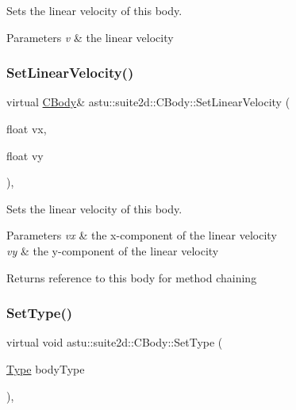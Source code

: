 Sets the linear velocity of this body.


\begin{DoxyParams}{Parameters}
{\em v} & the linear velocity \\
\hline
\end{DoxyParams}
\mbox{\label{classastu_1_1suite2d_1_1CBody_a782e16301f7268e7a511df7cdf39e168}} 
\subsubsection{\texorpdfstring{Set\+Linear\+Velocity()}{SetLinearVelocity()}\hspace{0.1cm}{\footnotesize\ttfamily [2/2]}}
{\footnotesize\ttfamily virtual \hyperlink{classastu_1_1suite2d_1_1CBody}{C\+Body}\& astu\+::suite2d\+::\+C\+Body\+::\+Set\+Linear\+Velocity (\begin{DoxyParamCaption}\item[{float}]{vx,  }\item[{float}]{vy }\end{DoxyParamCaption})\hspace{0.3cm}{\ttfamily [inline]}, {\ttfamily [virtual]}}

Sets the linear velocity of this body.


\begin{DoxyParams}{Parameters}
{\em vx} & the x-\/component of the linear velocity \\
\hline
{\em vy} & the y-\/component of the linear velocity \\
\hline
\end{DoxyParams}
\begin{DoxyReturn}{Returns}
reference to this body for method chaining 
\end{DoxyReturn}
\mbox{\label{classastu_1_1suite2d_1_1CBody_a7bc4b66e64442095a7b5ef4c689e6ccd}} 
\subsubsection{\texorpdfstring{Set\+Type()}{SetType()}}
{\footnotesize\ttfamily virtual void astu\+::suite2d\+::\+C\+Body\+::\+Set\+Type (\begin{DoxyParamCaption}\item[{\hyperlink{classastu_1_1suite2d_1_1CBody_a5731a8b9f24de5494683e4b7e8016b64}{Type}}]{body\+Type }\end{DoxyParamCaption})\hspace{0.3cm}{\ttfamily [inline]}, {\ttfamily [virtual]}}

